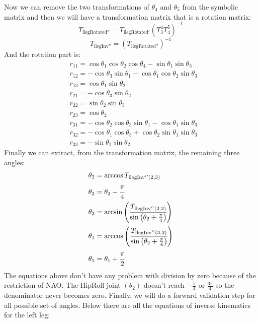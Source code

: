 Now we can remove the two transformations of $\theta_4$ and $\theta_5$ from the symbolic matrix and then we will have a transformation matrix that is a rotation matrix:
\[
T_{\text{llegRotated}''} = T_{\text{llegRotated}'}\left(T^4_3T^5_4\right)^{-1}
\]
\[
T_{\text{llegInv}''} = \left(T_{\text{llegRotated}''}\right)^{-1}
\]
And the rotation part is:
\begin{align*}
&r_{11} = \cos\theta_1\cos\theta_2\cos\theta_4 - \sin\theta_1\sin\theta_3\\
&r_{12} = -\cos\theta_3\sin\theta_1 - \cos\theta_1\cos\theta_2\sin\theta_3\\
&r_{13} = \cos\theta_1\sin\theta_2 \\
&r_{21} = -\cos\theta_3\sin\theta_2\\
&r_{22} = \sin\theta_2\sin\theta_3\\
&r_{23} = \cos\theta_2\\
&r_{31} = -\cos\theta_2\cos\theta_3\sin\theta_1 - \cos\theta_1\sin\theta_3\\
&r_{32} = -\cos\theta_1\cos\theta_3 + \cos\theta_2\sin\theta_1\sin\theta_3\\
&r_{33} = -\sin\theta_1\sin\theta_2
\end{align*}
Finally we can extract, from the transformation matrix, the remaining three angles:
\begin{align*}
\theta_2 &= \arccos T_{\text{llegInv}''(2,3)}\\
\theta_2 &= \theta_2 - \cfrac{\pi}{4}\\
\theta_3 &= \arcsin\left(\cfrac{T_{\text{llegInv}''(2,2)}}{\sin\left(\theta_2+\frac{\pi}{4}\right)}\right)\\
\theta_1 &= \arccos\left(\cfrac{T_{\text{llegInv}''(3,3)}}{\sin\left(\theta_2+\frac{\pi}{4}\right)}\right)\\
\theta_1 &= \theta_1 + \cfrac{\pi}{2}
\end{align*}
The equations above don't have any problem with division by zero because of the restriction of NAO. The HipRoll joint $(\theta_2)$ doesn't reach $-\frac{\pi}{4}$ or $\frac{3\pi}{4}$ so the denominator never becomes zero. Finally, we will do a forward validation step for all possible set of angles.
Below there are all the equations of inverse kinematics for the left leg:
